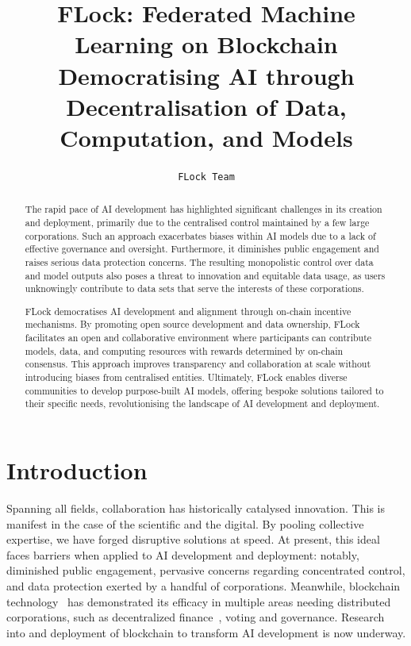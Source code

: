 \documentclass[conference]{IEEEtran}
\title{FLock: Federated Machine Learning on Blockchain \\ \vspace{0.5cm}\large 
Democratising AI through Decentralisation of Data, Computation, and Models
}
\author{\texttt{FLock Team}}
\begin{document}
\pagecolor{backgroundcolor}
\maketitle
\thispagestyle{empty}

\begin{abstract}
 The rapid pace of AI development has highlighted significant challenges in its creation and deployment, primarily due to the centralised control maintained by a few large corporations. Such an approach exacerbates biases within AI models due to a lack of effective governance and oversight. Furthermore, it diminishes public engagement and raises serious data protection concerns. The resulting monopolistic control over data and model outputs also poses a threat to innovation and equitable data usage, as users unknowingly contribute to data sets that serve the interests of these corporations.

 FLock democratises AI development and alignment through on-chain incentive mechanisms. By promoting open source development and data ownership, FLock facilitates an open and collaborative environment where participants can contribute models, data, and computing resources with rewards determined by on-chain consensus. This approach improves transparency and collaboration at scale without introducing biases from centralised entities. Ultimately, FLock enables diverse communities to develop purpose-built AI models, offering bespoke solutions tailored to their specific needs, revolutionising the landscape of AI development and deployment.
 
\end{abstract}

\section{Introduction}

Spanning all fields, collaboration has historically catalysed innovation. This is manifest in the case of the scientific and the digital. By pooling collective expertise, we have forged disruptive solutions at speed. At present, this ideal faces barriers when applied to AI development and deployment: notably, diminished public engagement, pervasive concerns regarding concentrated control, and data protection exerted by a handful of corporations. Meanwhile, blockchain technology~\cite{nakamoto2008bitcoin, wood2014ethereum} has demonstrated its efficacy in multiple areas needing distributed corporations, such as decentralized finance~\cite{werner2022sok}, voting and governance. Research into and deployment of blockchain to transform AI development is now underway. 
\end{document}
